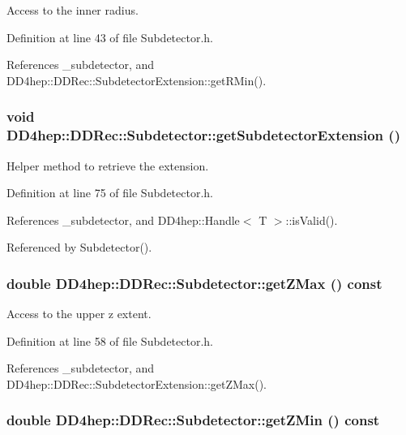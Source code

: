 Access to the inner radius. 

Definition at line 43 of file Subdetector.h.

References \_\-subdetector, and DD4hep::DDRec::SubdetectorExtension::getRMin().\hypertarget{class_d_d4hep_1_1_d_d_rec_1_1_subdetector_a40f367c23928392476ad5c3f98da8a1a}{
\subsubsection[{getSubdetectorExtension}]{\setlength{\rightskip}{0pt plus 5cm}void DD4hep::DDRec::Subdetector::getSubdetectorExtension ()}}
\label{class_d_d4hep_1_1_d_d_rec_1_1_subdetector_a40f367c23928392476ad5c3f98da8a1a}


Helper method to retrieve the extension. 

Definition at line 75 of file Subdetector.h.

References \_\-subdetector, and DD4hep::Handle$<$ T $>$::isValid().

Referenced by Subdetector().\hypertarget{class_d_d4hep_1_1_d_d_rec_1_1_subdetector_ac99969b1e8f25dc90a73a5d60c8bc065}{
\subsubsection[{getZMax}]{\setlength{\rightskip}{0pt plus 5cm}double DD4hep::DDRec::Subdetector::getZMax () const}}
\label{class_d_d4hep_1_1_d_d_rec_1_1_subdetector_ac99969b1e8f25dc90a73a5d60c8bc065}


Access to the upper z extent. 

Definition at line 58 of file Subdetector.h.

References \_\-subdetector, and DD4hep::DDRec::SubdetectorExtension::getZMax().\hypertarget{class_d_d4hep_1_1_d_d_rec_1_1_subdetector_a19f31cd6e82a8150885f2b73477eb114}{
\subsubsection[{getZMin}]{\setlength{\rightskip}{0pt plus 5cm}double DD4hep::DDRec::Subdetector::getZMin () const}}
\label{class_d_d4hep_1_1_d_d_rec_1_1_subdetector_a19f31cd6e82a8150885f2b73477eb114}


